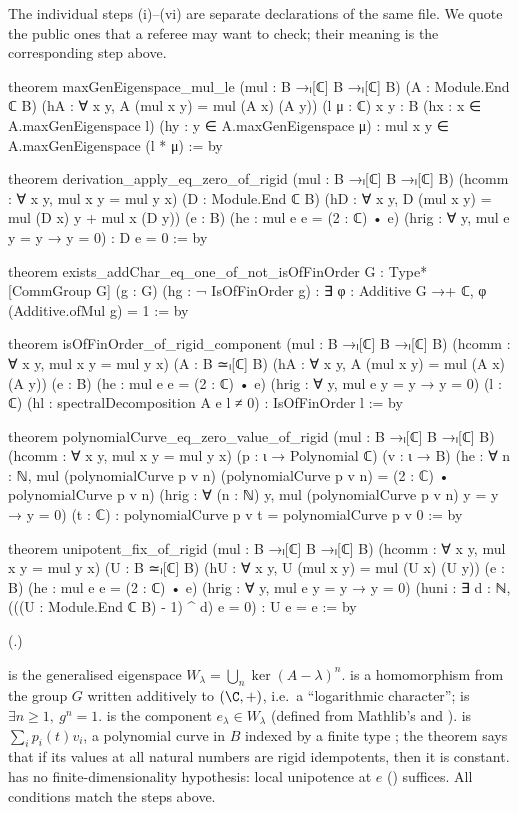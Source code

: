 The individual steps (i)--(vi) are separate declarations of the same file.  We quote the public ones that a referee
may want to check; their meaning is the corresponding step above.
\begin{leancode}
theorem maxGenEigenspace_mul_le (mul : B →ₗ[ℂ] B →ₗ[ℂ] B)
    (A : Module.End ℂ B) (hA : ∀ x y, A (mul x y) = mul (A x) (A y))
    (l μ : ℂ) {x y : B}
    (hx : x ∈ A.maxGenEigenspace l) (hy : y ∈ A.maxGenEigenspace μ) :
    mul x y ∈ A.maxGenEigenspace (l * μ) := by

theorem derivation_apply_eq_zero_of_rigid (mul : B →ₗ[ℂ] B →ₗ[ℂ] B)
    (hcomm : ∀ x y, mul x y = mul y x) (D : Module.End ℂ B)
    (hD : ∀ x y, D (mul x y) = mul (D x) y + mul x (D y))
    (e : B) (he : mul e e = (2 : ℂ) • e)
    (hrig : ∀ y, mul e y = y → y = 0) : D e = 0 := by

theorem exists_addChar_eq_one_of_not_isOfFinOrder {G : Type*} [CommGroup G]
    (g : G) (hg : ¬ IsOfFinOrder g) :
    ∃ φ : Additive G →+ ℂ, φ (Additive.ofMul g) = 1 := by

theorem isOfFinOrder_of_rigid_component (mul : B →ₗ[ℂ] B →ₗ[ℂ] B)
    (hcomm : ∀ x y, mul x y = mul y x)
    (A : B ≃ₗ[ℂ] B) (hA : ∀ x y, A (mul x y) = mul (A x) (A y))
    (e : B) (he : mul e e = (2 : ℂ) • e)
    (hrig : ∀ y, mul e y = y → y = 0)
    (l : ℂ) (hl : spectralDecomposition A e l ≠ 0) : IsOfFinOrder l := by

theorem polynomialCurve_eq_zero_value_of_rigid (mul : B →ₗ[ℂ] B →ₗ[ℂ] B)
    (hcomm : ∀ x y, mul x y = mul y x) (p : ι → Polynomial ℂ) (v : ι → B)
    (he : ∀ n : ℕ, mul (polynomialCurve p v n) (polynomialCurve p v n) =
      (2 : ℂ) • polynomialCurve p v n)
    (hrig : ∀ (n : ℕ) y, mul (polynomialCurve p v n) y = y → y = 0)
    (t : ℂ) : polynomialCurve p v t = polynomialCurve p v 0 := by

theorem unipotent_fix_of_rigid (mul : B →ₗ[ℂ] B →ₗ[ℂ] B)
    (hcomm : ∀ x y, mul x y = mul y x)
    (U : B ≃ₗ[ℂ] B) (hU : ∀ x y, U (mul x y) = mul (U x) (U y))
    (e : B) (he : mul e e = (2 : ℂ) • e)
    (hrig : ∀ y, mul e y = y → y = 0)
    (huni : ∃ d : ℕ, (((U : Module.End ℂ B) - 1) ^ d) e = 0) : U e = e := by
\end{leancode}
(.)
\begin{dictionary}
 is the generalised eigenspace $W_\lambda=\bigcup_n\ker(A-\lambda)^n$.
 is a homomorphism from the group $G$ written additively to $(\C,+)$, i.e.\ a ``logarithmic
character'';  is $\exists n\ge1,\ g^n=1$.   is the component
$e_\lambda\in W_\lambda$ (defined from Mathlib's  and
).   is $\sum_ip_i(t)v_i$, a polynomial curve in $B$
indexed by a finite type ; the theorem says that if its values at all natural numbers are rigid idempotents,
then it is constant.   has no finite-dimensionality hypothesis: local unipotence at $e$
() suffices.  All conditions match the steps above.
\end{dictionary}
